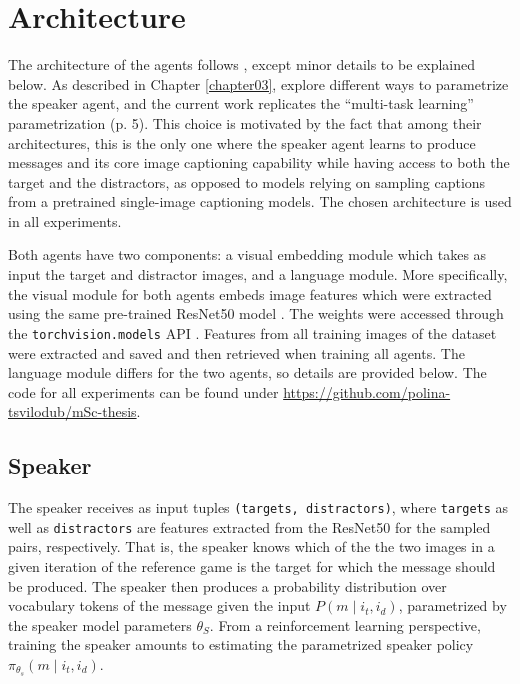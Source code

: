 \section{Architecture}
\label{architecture}
The architecture of the agents follows \textcite{lazaridou2020multi}, except minor details to be explained below. As described in Chapter \ref{chapter03}, \textcite{lazaridou2020multi} explore different ways to parametrize the speaker agent, and the current work replicates the ``multi-task learning'' parametrization (p. 5). This choice is motivated by the fact that among their architectures, this is the only one where the speaker agent learns to produce messages and its core image captioning capability while having access to both the target and the distractors, as opposed to models relying on sampling captions from a pretrained single-image captioning models. The chosen architecture is used in all experiments.

Both agents have two components: a visual embedding module which takes as input the target and distractor images, and a language module. More specifically, the visual module for both agents embeds image features which were extracted using the same pre-trained ResNet50 model \parencite{he2016deep}. The weights were accessed through the \texttt{torchvision.models} API \parencite{marcel2010torchvision}. Features from all training images of the dataset were extracted and saved and then retrieved when training all agents. 
The language module differs for the two agents, so details are provided below. 
The code for all experiments can be found under \url{https://github.com/polina-tsvilodub/mSc-thesis}. 

\subsection{Speaker}
The speaker receives as input tuples \texttt{(targets, distractors)}, where \texttt{targets} as well as \texttt{distractors} are features extracted from the ResNet50 for the sampled pairs, respectively. That is, the speaker knows which of the the two images in a given iteration of the reference game is the target for which the message should be produced. The speaker then produces a probability distribution over vocabulary tokens of the message given the input $P(m \mid i_t, i_d)$, parametrized by the speaker model parameters $\theta_S$. From a reinforcement learning perspective, training the speaker amounts to estimating the parametrized speaker policy $\pi_{\theta_s}(m \mid i_t, i_d)$.

